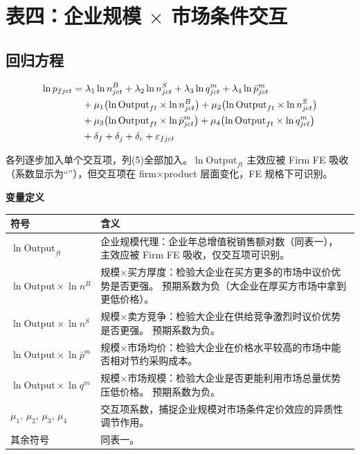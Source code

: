 \documentclass[12pt]{article}
\begin{document}
\clearpage

\section*{表四：企业规模 $\times$ 市场条件交互}

\subsection*{回归方程}

\begin{align}
  \ln p_{fjct}
    &= \lambda_1\ln n^{B}_{jct}
     + \lambda_2\ln n^{S}_{jct}
     + \lambda_3\ln q^{m}_{jct}
     + \lambda_4\ln\bar{p}^{m}_{jct} \notag\\
    &\quad
     + \mu_1\bigl(\ln\mathrm{Output}_{ft}\times\ln n^{B}_{jct}\bigr)
     + \mu_2\bigl(\ln\mathrm{Output}_{ft}\times\ln n^{S}_{jct}\bigr) \notag\\
    &\quad
     + \mu_3\bigl(\ln\mathrm{Output}_{ft}\times\ln\bar{p}^{m}_{jct}\bigr)
     + \mu_4\bigl(\ln\mathrm{Output}_{ft}\times\ln q^{m}_{jct}\bigr) \notag\\
    &\quad
     + \delta_{f} + \delta_{j} + \delta_{c} + \varepsilon_{fjct}
  \label{eq:interactions}
\end{align}

\noindent 各列逐步加入单个交互项，列(5)全部加入。$\ln\mathrm{Output}_{ft}$ 主效应被 Firm FE 吸收（系数显示为``\textemdash''），但交互项在 firm$\times$product 层面变化，FE 规格下可识别。

\medskip
\noindent\textbf{变量定义}

\smallskip
{\small
\begin{tabular}{@{} L{4.2cm} L{9.8cm} @{}}
\toprule
符号 & 含义 \\
\midrule
$\ln\mathrm{Output}_{ft}$ &
  企业规模代理：企业年总增值税销售额对数（同表一），
  主效应被 Firm FE 吸收，仅交互项可识别。\\[4pt]
$\ln\mathrm{Output}\times\ln n^{B}$ &
  规模$\times$买方厚度：检验大企业在买方更多的市场中议价优势是否更强。
  预期系数为负（大企业在厚买方市场中拿到更低价格）。\\[4pt]
$\ln\mathrm{Output}\times\ln n^{S}$ &
  规模$\times$卖方竞争：检验大企业在供给竞争激烈时议价优势是否更强。
  预期系数为负。\\[4pt]
$\ln\mathrm{Output}\times\ln\bar{p}^{m}$ &
  规模$\times$市场均价：检验大企业在价格水平较高的市场中能否相对节约采购成本。\\[4pt]
$\ln\mathrm{Output}\times\ln q^{m}$ &
  规模$\times$市场规模：检验大企业是否更能利用市场总量优势压低价格。
  预期系数为负。\\[4pt]
$\mu_1,\,\mu_2,\,\mu_3,\,\mu_4$ &
  交互项系数，捕捉企业规模对市场条件定价效应的异质性调节作用。\\[4pt]
其余符号 & 同表一。\\
\bottomrule
\end{tabular}
}
\end{document}
